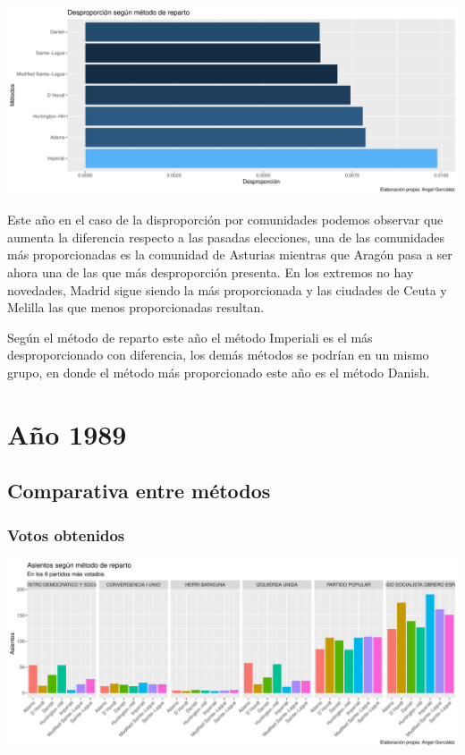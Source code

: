 \documentclass[12pt,a4paper,]{book}
\numberwithin{dummy}{section}
\theoremstyle{ocrenumbox}
\theoremstyle{blacknumex}
\theoremstyle{blacknumbox}
\theoremstyle{ocrenum}
\theoremstyle{ocrenum}
\begin{document}
\begin{center}\includegraphics[width=0.95\linewidth]{figurasR/unnamed-chunk-87-2} \end{center}

Este año en el caso de la disproporción por comunidades podemos observar
que aumenta la diferencia respecto a las pasadas elecciones, una de las
comunidades más proporcionadas es la comunidad de Asturias mientras que
Aragón pasa a ser ahora una de las que más desproporción presenta. En
los extremos no hay novedades, Madrid sigue siendo la más proporcionada
y las ciudades de Ceuta y Melilla las que menos proporcionadas resultan.

Según el método de reparto este año el método Imperiali es el más
desproporcionado con diferencia, los demás métodos se podrían en un
mismo grupo, en donde el método más proporcionado este año es el método
Danish.

\hypertarget{auxf1o-1989}{%
\section{Año 1989}\label{auxf1o-1989}}

\hypertarget{comparativa-entre-muxe9todos-4}{%
\subsection{Comparativa entre
métodos}\label{comparativa-entre-muxe9todos-4}}

\hypertarget{votos-obtenidos-4}{%
\subsubsection{Votos obtenidos}\label{votos-obtenidos-4}}

\begin{center}\includegraphics[width=0.95\linewidth]{figurasR/unnamed-chunk-95-1} \end{center}
\end{document}
